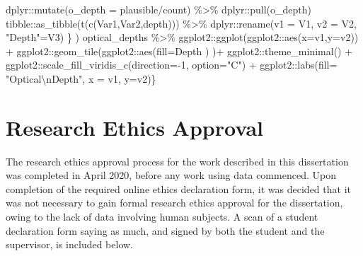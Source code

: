 \documentclass[
  12pt,
  a4paper,
  twoside]{book}
\newenvironment{Shaded}{\begin{snugshade}}{\end{snugshade}}
\newcommand{\AttributeTok}[1]{\textcolor[rgb]{0.77,0.63,0.00}{#1}}
\newcommand{\DecValTok}[1]{\textcolor[rgb]{0.00,0.00,0.81}{#1}}
\newcommand{\FunctionTok}[1]{\textcolor[rgb]{0.00,0.00,0.00}{#1}}
\newcommand{\NormalTok}[1]{#1}
\newcommand{\OtherTok}[1]{\textcolor[rgb]{0.56,0.35,0.01}{#1}}
\newcommand{\SpecialCharTok}[1]{\textcolor[rgb]{0.00,0.00,0.00}{#1}}
\newcommand{\StringTok}[1]{\textcolor[rgb]{0.31,0.60,0.02}{#1}}
\begin{document}
\begin{Shaded}
\begin{Highlighting}[]
\NormalTok{      dplyr}\SpecialCharTok{::}\FunctionTok{mutate}\NormalTok{(}\AttributeTok{o\_depth =}\NormalTok{ plausible}\SpecialCharTok{/}\NormalTok{count) }\SpecialCharTok{\%\textgreater{}\%} 
\NormalTok{      dplyr}\SpecialCharTok{::}\FunctionTok{pull}\NormalTok{(o\_depth)}
\NormalTok{    tibble}\SpecialCharTok{::}\FunctionTok{as\_tibble}\NormalTok{(}\FunctionTok{t}\NormalTok{(}\FunctionTok{c}\NormalTok{(Var1,Var2,depth))) }\SpecialCharTok{\%\textgreater{}\%}
\NormalTok{      dplyr}\SpecialCharTok{::}\FunctionTok{rename}\NormalTok{(}\AttributeTok{v1 =}\NormalTok{ V1, }\AttributeTok{v2 =}\NormalTok{ V2, }\StringTok{"Depth"}\OtherTok{=}\NormalTok{V3)}
\NormalTok{  \} )}
\NormalTok{  optical\_depths }\SpecialCharTok{\%\textgreater{}\%}
\NormalTok{    ggplot2}\SpecialCharTok{::}\FunctionTok{ggplot}\NormalTok{(ggplot2}\SpecialCharTok{::}\FunctionTok{aes}\NormalTok{(}\AttributeTok{x=}\NormalTok{v1,}\AttributeTok{y=}\NormalTok{v2)) }\SpecialCharTok{+}
\NormalTok{    ggplot2}\SpecialCharTok{::}\FunctionTok{geom\_tile}\NormalTok{(ggplot2}\SpecialCharTok{::}\FunctionTok{aes}\NormalTok{(}\AttributeTok{fill=}\NormalTok{Depth  ) )}\SpecialCharTok{+}
\NormalTok{    ggplot2}\SpecialCharTok{::}\FunctionTok{theme\_minimal}\NormalTok{() }\SpecialCharTok{+} 
\NormalTok{    ggplot2}\SpecialCharTok{::}\FunctionTok{scale\_fill\_viridis\_c}\NormalTok{(}\AttributeTok{direction=}\SpecialCharTok{{-}}\DecValTok{1}\NormalTok{,}
                                  \AttributeTok{option=}\StringTok{"C"}\NormalTok{) }\SpecialCharTok{+}
\NormalTok{    ggplot2}\SpecialCharTok{::}\FunctionTok{labs}\NormalTok{(}\AttributeTok{fill=} \StringTok{"Optical}\SpecialCharTok{\textbackslash{}n}\StringTok{Depth"}\NormalTok{,}
                  \AttributeTok{x =}\NormalTok{ v1, }\AttributeTok{y=}\NormalTok{v2)\}}
\end{Highlighting}
\end{Shaded}

\hypertarget{ethics-approval}{%
\chapter{Research Ethics Approval}\label{ethics-approval}}

The research ethics approval process for the work described in this dissertation was completed in April 2020, before any work using data commenced. Upon completion of the required online ethics declaration form, it was decided that it was not necessary to gain formal research ethics approval for the dissertation, owing to the lack of data involving human subjects. A scan of a student declaration form saying as much, and signed by both the student and the supervisor, is included below.
\end{document}
